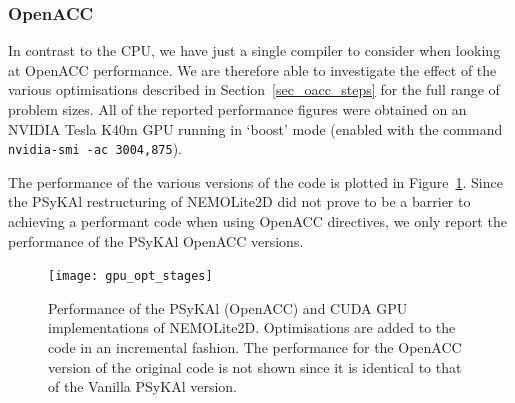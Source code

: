 \documentclass[gmd, manuscript]{copernicus}
\begin{document}


\subsubsection{OpenACC}

In contrast to the CPU, we have just a single compiler to consider
when looking at OpenACC performance. We are therefore able to
investigate the effect of the various optimisations described in
Section~\ref{sec_oacc_steps} for the full range of problem sizes.  All
of the reported performance figures were obtained on an NVIDIA Tesla
K40m GPU running in `boost' mode (enabled with the command
\texttt{nvidia-smi -ac 3004,875}).

The performance of the various versions of the code is plotted in
Figure~\ref{FIG_gpu_opt_stages}.  Since the {PS}y{KA}l restructuring
of NEMOLite2D did not prove to be a barrier to achieving a performant
code when using OpenACC directives, we only report the performance of
the {PS}y{KA}l OpenACC versions.

\begin{figure}
\centering
\texttt{[image: gpu\_opt\_stages]}
\caption{Performance of the {PS}y{KA}l (OpenACC) and CUDA GPU
  implementations of NEMOLite2D. Optimisations are added to the code
  in an incremental fashion. The performance for the OpenACC version
  of the original code is not shown since it is identical to that of
  the Vanilla {PS}y{KA}l version.}
\label{FIG_gpu_opt_stages}
\end{figure}
\end{document}
